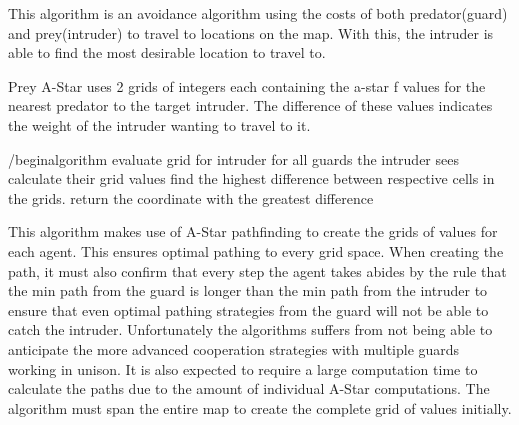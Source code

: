 This algorithm is an avoidance algorithm using the costs of both predator(guard) and prey(intruder) to travel to locations on the map. With this, the intruder is able to find the most desirable location to travel to.

    Prey A-Star uses 2 grids of integers each containing the a-star f values for the nearest predator to the target intruder. The difference of these values indicates the weight of the intruder wanting to travel to it.
    
    /begin{algorithm}
        evaluate grid for intruder
        for all guards the intruder sees
            calculate their grid values
        find the highest difference between respective cells in the grids. 
        return the coordinate with the greatest difference
        
    
    This algorithm makes use of A-Star pathfinding to create the grids of values for each agent. This ensures optimal pathing to every grid space. When creating the path, it must also confirm that every step the agent takes abides by the rule that the min path from the guard is longer than the min path from the intruder to ensure that even optimal pathing strategies from the guard will not be able to catch the intruder. 
    Unfortunately the algorithms suffers from not being able to anticipate the more advanced cooperation strategies with multiple guards working in unison. It is also expected to require a large computation time to calculate the paths due to the amount of individual A-Star computations. The algorithm must span the entire map to create the complete grid of values initially. 

